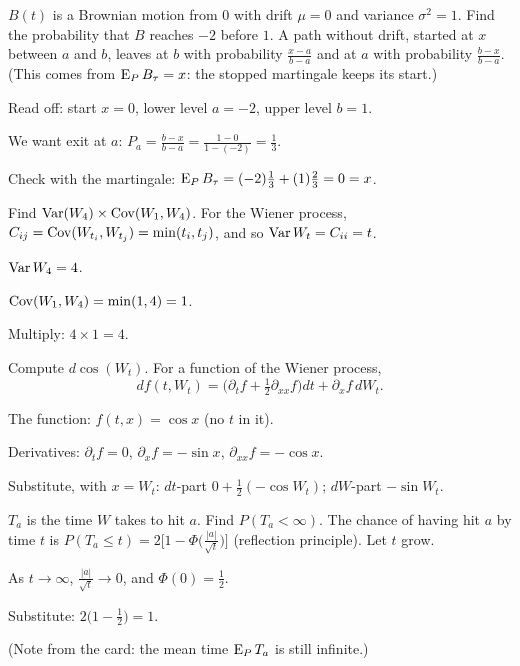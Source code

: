 \begin{problem}[Q1(c)]
$B(t)$ is a Brownian motion from $0$ with drift $\mu=0$ and variance $\sigma^2=1$. Find the probability that $B$ reaches $-2$ before $1$.
\cardsays A path without drift, started at $x$ between $a$ and $b$, leaves at $b$ with probability $\frac{x-a}{b-a}$ and at $a$ with probability $\frac{b-x}{b-a}$. (This comes from $\operatorname{E}_PB_\tau=x$: the stopped martingale keeps its start.)
\working
\begin{steps}
\item Read off: start $x=0$, lower level $a=-2$, upper level $b=1$.
\item We want exit at $a$: $P_a=\frac{b-x}{b-a}=\frac{1-0}{1-(-2)}=\frac13$.
\item Check with the martingale: $\operatorname{E}_PB_\tau=(-2)\frac13+(1)\frac23=0=x$.
\end{steps}
\end{problem}

\begin{problem}[Q1(d)]
Find $\operatorname{Var}(W_4)\times\operatorname{Cov}(W_1,W_4)$.
\cardsays For the Wiener process, $C_{ij}=\operatorname{Cov}(W_{t_i},W_{t_j})=\min(t_i,t_j)$, and so $\operatorname{Var} W_t=C_{ii}=t$.
\working
\begin{steps}
\item $\operatorname{Var} W_4=4$.
\item $\operatorname{Cov}(W_1,W_4)=\min(1,4)=1$.
\item Multiply: $4\times1=4$.
\end{steps}
\end{problem}

\begin{problem}[Q1(e)]
Compute $d\cos(W_t)$.
\cardsays For a function of the Wiener process,
\[
df(t,W_t)=\Big(\partial_tf+\tfrac12\partial_{xx}f\Big)dt+\partial_xf\,dW_t.
\]
\working
\begin{steps}
\item The function: $f(t,x)=\cos x$ (no $t$ in it).
\item Derivatives: $\partial_tf=0$, $\partial_xf=-\sin x$, $\partial_{xx}f=-\cos x$.
\item Substitute, with $x=W_t$: $dt$-part $0+\frac12(-\cos W_t)$; $dW$-part $-\sin W_t$.
\end{steps}
\end{problem}

\begin{problem}[Q1(f)]
$T_a$ is the time $W$ takes to hit $a$. Find $P(T_a<\infty)$.
\cardsays The chance of having hit $a$ by time $t$ is $P(T_a\le t)=2\big[1-\Phi\big(\frac{|a|}{\sqrt t}\big)\big]$ (reflection principle). Let $t$ grow.
\working
\begin{steps}
\item As $t\to\infty$, $\frac{|a|}{\sqrt t}\to0$, and $\Phi(0)=\frac12$.
\item Substitute: $2\big(1-\frac12\big)=1$.
\item (Note from the card: the mean time $\operatorname{E}_PT_a$ is still infinite.)
\end{steps}
\end{problem}

